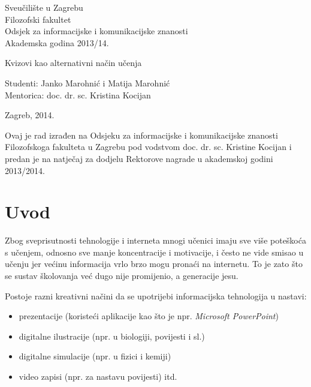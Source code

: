 \documentclass[11pt]{scrreprt}
\begin{document}
\begin{titlepage}

\begin{center}

  Sveučilište u Zagrebu\\
  Filozofski fakultet\\
  Odsjek za informacijske i komunikacijske znanosti\\
  Akademska godina 2013/14.

  \vspace*{150pt}

  { \huge Kvizovi kao alternativni način učenja }

  \vfill

  { \large Studenti: Janko Marohnić i Matija Marohnić\\
  Mentorica: doc. dr. sc. Kristina Kocijan }

  \vspace*{40pt}

  Zagreb, 2014.

\end{center}

\end{titlepage}

\pagebreak

\vspace*{240pt}

Ovaj je rad izrađen na Odsjeku za informacijske i komunikacijske znanosti
Filozofskoga fakulteta u Zagrebu pod vodstvom doc. dr. sc. Kristine Kocijan i
predan je na natječaj za dodjelu Rektorove nagrade u akademskoj godini
2013/2014.

\pagebreak

\tableofcontents

\chapter{Uvod}


Zbog sveprisutnosti tehnologije i interneta mnogi učenici imaju sve više
poteškoća s učenjem, odnosno sve manje koncentracije i motivacije, i često ne
vide smisao u učenju jer većinu informacija vrlo brzo mogu pronaći na internetu.
To je zato što se sustav školovanja već dugo nije promijenio, a generacije
jesu.\cite{perisic13}

Postoje razni kreativni načini da se upotrijebi informacijska tehnologija u
nastavi:

\begin{itemize}
  \item prezentacije (koristeći aplikacije kao što je npr. \emph{Microsoft
    PowerPoint})
  \item digitalne ilustracije (npr. u biologiji, povijesti i sl.)
  \item digitalne simulacije (npr. u fizici i kemiji)
  \item video zapisi (npr. za nastavu povijesti) itd.
\end{itemize}
\end{document}
